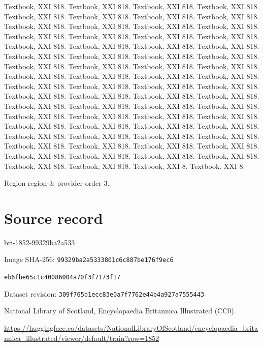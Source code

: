 \documentclass[11pt]{article}
\begin{document}
Textbook, XXI 818.
Textbook, XXI 818.
Textbook, XXI 818.
Textbook, XXI 818.
Textbook, XXI 818.
Textbook, XXI 818.
Textbook, XXI 818.
Textbook, XXI 818.
Textbook, XXI 818.
Textbook, XXI 818.
Textbook, XXI 818.
Textbook, XXI 818.
Textbook, XXI 818.
Textbook, XXI 818.
Textbook, XXI 818.
Textbook, XXI 818.
Textbook, XXI 818.
Textbook, XXI 818.
Textbook, XXI 818.
Textbook, XXI 818.
Textbook, XXI 818.
Textbook, XXI 818.
Textbook, XXI 818.
Textbook, XXI 818.
Textbook, XXI 818.
Textbook, XXI 818.
Textbook, XXI 818.
Textbook, XXI 818.
Textbook, XXI 818.
Textbook, XXI 818.
Textbook, XXI 818.
Textbook, XXI 818.
Textbook, XXI 818.
Textbook, XXI 818.
Textbook, XXI 818.
Textbook, XXI 818.
Textbook, XXI 818.
Textbook, XXI 818.
Textbook, XXI 818.
Textbook, XXI 818.
Textbook, XXI 818.
Textbook, XXI 818.
Textbook, XXI 818.
Textbook, XXI 818.
Textbook, XXI 818.
Textbook, XXI 818.
Textbook, XXI 818.
Textbook, XXI 818.
Textbook, XXI 818.
Textbook, XXI 818.
Textbook, XXI 818.
Textbook, XXI 818.
Textbook, XXI 818.
Textbook, XXI 818.
Textbook, XXI 818.
Textbook, XXI 818.
Textbook, XXI 818.
Textbook, XXI 818.
Textbook, XXI 818.
Textbook, XXI 818.
Textbook, XXI 818.
Textbook, XXI 818.
Textbook, XXI 818.
Textbook, XXI 818.
Textbook, XXI 818.
Textbook, XXI 818.
Textbook, XXI 8.
Textbook.
XXI 8.
\par

{\scriptsize\color{gray} Region region-3; provider order 3.\par}
\medskip
\newpage\section*{Source record}
bri-1852-99329ba2a533\par
Image SHA-256: \texttt{99329ba2a5333801c6c887be176f9ec6}\par\texttt{eb6fbe65c1c40086004a70f3f7173f17}\par
Dataset revision: \texttt{309f765b1ecc83e0a7f7}\texttt{762e44b4a927a7555443}\par
National Library of Scotland, Encyclopaedia Britannica Illustrated (CC0).\par
\url{https://huggingface.co/datasets/NationalLibraryOfScotland/encyclopaedia_britannica_illustrated/viewer/default/train?row=1852}
\end{document}
